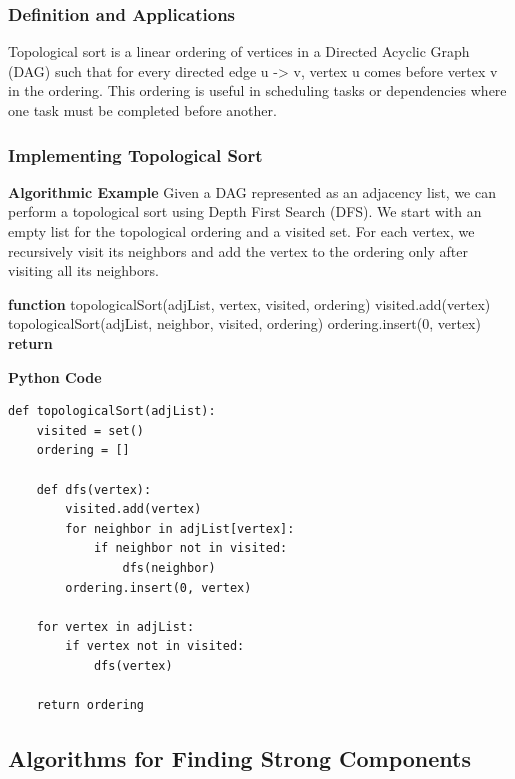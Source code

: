 \documentclass[12pt]{book} %
\begin{document}
\subsubsection{Definition and Applications}
Topological sort is a linear ordering of vertices in a Directed Acyclic Graph (DAG) such that for every directed edge u -> v, vertex u comes before vertex v in the ordering. This ordering is useful in scheduling tasks or dependencies where one task must be completed before another.
\subsubsection{Implementing Topological Sort}
\FloatBarrier
\textbf{Algorithmic Example}
\FloatBarrier
Given a DAG represented as an adjacency list, we can perform a topological sort using Depth First Search (DFS). We start with an empty list for the topological ordering and a visited set. For each vertex, we recursively visit its neighbors and add the vertex to the ordering only after visiting all its neighbors.
\FloatBarrier
\begin{algorithm}
\caption{Topological Sort using DFS}
\begin{algorithmic}[1]
\State \textbf{function} topologicalSort(adjList, vertex, visited, ordering)
\State \hspace{\algorithmicindent} visited.add(vertex)
\State topologicalSort(adjList, neighbor, visited, ordering)
\EndIf
\EndFor
\State ordering.insert(0, vertex)
\State \textbf{return}

\end{algorithmic}
\end{algorithm}
\FloatBarrier
\textbf{Python Code}
\FloatBarrier
\begin{lstlisting}
def topologicalSort(adjList):
    visited = set()
    ordering = []

    def dfs(vertex):
        visited.add(vertex)
        for neighbor in adjList[vertex]:
            if neighbor not in visited:
                dfs(neighbor)
        ordering.insert(0, vertex)

    for vertex in adjList:
        if vertex not in visited:
            dfs(vertex)

    return ordering
\end{lstlisting}
\FloatBarrier

\subsection{Algorithms for Finding Strong Components}
\end{document}
